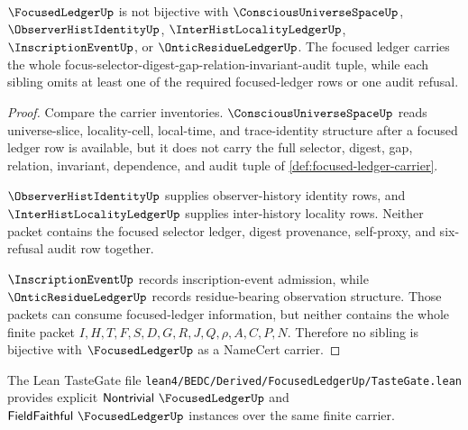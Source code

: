 \begin{theorem}
\label{thm:focused-ledger-sibling-independence}
$\FocusedLedgerUp$ is not bijective with $\ConsciousUniverseSpaceUp$, $\ObserverHistIdentityUp$, $\InterHistLocalityLedgerUp$, $\InscriptionEventUp$, or $\OnticResidueLedgerUp$. The focused ledger carries the whole focus-selector-digest-gap-relation-invariant-audit tuple, while each sibling omits at least one of the required focused-ledger rows or one audit refusal.
\end{theorem}
\begin{proof}
Compare the carrier inventories. $\ConsciousUniverseSpaceUp$ reads universe-slice, locality-cell, local-time, and trace-identity structure after a focused ledger row is available, but it does not carry the full selector, digest, gap, relation, invariant, dependence, and audit tuple of \autoref{def:focused-ledger-carrier}.

$\ObserverHistIdentityUp$ supplies observer-history identity rows, and $\InterHistLocalityLedgerUp$ supplies inter-history locality rows. Neither packet contains the focused selector ledger, digest provenance, self-proxy, and six-refusal audit row together.

$\InscriptionEventUp$ records inscription-event admission, while $\OnticResidueLedgerUp$ records residue-bearing observation structure. Those packets can consume focused-ledger information, but neither contains the whole finite packet $I,H,T,F,S,D,G,R,J,Q,\rho,A,C,P,N$. Therefore no sibling is bijective with $\FocusedLedgerUp$ as a NameCert carrier.
\end{proof}



The Lean TasteGate file \texttt{lean4/BEDC/Derived/FocusedLedgerUp/TasteGate.lean} provides explicit $\mathsf{Nontrivial}\ \FocusedLedgerUp$ and $\mathsf{FieldFaithful}\ \FocusedLedgerUp$ instances over the same finite carrier.

